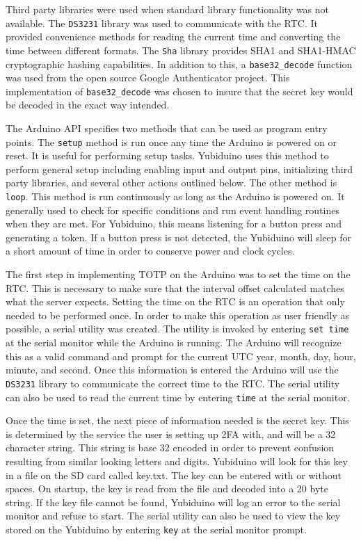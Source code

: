 \documentclass[conference]{IEEEtran}
\begin{document}
Third party libraries were used when standard library functionality was not
available.  The \texttt{DS3231} library was used to communicate with the RTC.
It provided convenience methods for reading the current time and converting the
time between different formats.  The \texttt{Sha} library provides SHA1 and
SHA1-HMAC cryptographic hashing capabilities.  In addition to this, a
\texttt{base32\_decode} function was used from the open source Google
Authenticator project.  This implementation of \texttt{base32\_decode} was
chosen to insure that the secret key would be decoded in the exact way
intended.

The Arduino API specifies two methods that can be used as program entry points.
The \texttt{setup} method is run once any time the Arduino is powered on or
reset.  It is useful for performing setup tasks.  Yubiduino uses this method to
perform general setup including enabling input and output pins, initializing
third party libraries, and several other actions outlined below.  The other
method is \texttt{loop}.  This method is run continuously as long as the
Arduino is powered on.  It generally used to check for specific conditions and
run event handling routines when they are met.  For Yubiduino, this means
listening for a button press and generating a token.  If a button press is not
detected, the Yubiduino will sleep for a short amount of time in order to
conserve power and clock cycles.

The first step in implementing TOTP on the Arduino was to set the time on the
RTC.  This is necessary to make sure that the interval offset calculated
matches what the server expects.  Setting the time on the RTC is an operation
that only needed to be performed once.  In order to make this operation as user
friendly as possible, a serial utility was created.  The utility is invoked by
entering \texttt{set time} at the serial monitor while the Arduino is running.
The Arduino will recognize this as a valid command and prompt for the current
UTC year, month, day, hour, minute, and second.  Once this information is
entered the Arduino will use the \texttt{DS3231} library to communicate the
correct time to the RTC.  The serial utility can also be used to read the
current time by entering \texttt{time} at the serial monitor.

Once the time is set, the next piece of information needed is the secret key.
This is determined by the service the user is setting up 2FA with, and will be
a 32 character string.  This string is base 32 encoded in order to prevent
confusion resulting from similar looking letters and digits.  Yubiduino will
look for this key in a file on the SD card called key.txt.  The key can be
entered with or without spaces.  On startup, the key is read from the file and
decoded into a 20 byte string.  If the key file cannot be found, Yubiduino will
log an error to the serial monitor and refuse to start.  The serial utility can
also be used to view the key stored on the Yubiduino by entering \texttt{key}
at the serial monitor prompt.  
\end{document}
